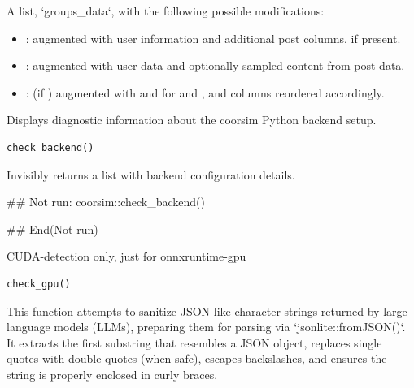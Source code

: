 \documentclass[a4paper]{book}
\begin{document}
%
\begin{Value}
A list, `groups\_data`, with the following possible modifications:
\begin{itemize}

\item{} : augmented with user information and additional post columns, if present.
\item{} : augmented with user data and optionally sampled content from post data.
\item{} : (if ) augmented with  and 
for  and , and columns reordered accordingly.

\end{itemize}

\end{Value}
%
\begin{Description}
Displays diagnostic information about the coorsim Python backend setup.
\end{Description}
%
\begin{Usage}
\begin{verbatim}
check_backend()
\end{verbatim}
\end{Usage}
%
\begin{Value}
Invisibly returns a list with backend configuration details.
\end{Value}
%
\begin{Examples}
\begin{ExampleCode}
## Not run: 
  coorsim::check_backend()

## End(Not run)
\end{ExampleCode}
\end{Examples}
%
\begin{Description}
CUDA-detection only, just for onnxruntime-gpu
\end{Description}
%
\begin{Usage}
\begin{verbatim}
check_gpu()
\end{verbatim}
\end{Usage}
%
\begin{Description}
This function attempts to sanitize JSON-like character strings returned by large language models (LLMs),
preparing them for parsing via `jsonlite::fromJSON()`. It extracts the first substring that resembles
a JSON object, replaces single quotes with double quotes (when safe), escapes backslashes,
and ensures the string is properly enclosed in curly braces.
\end{Description}
\end{document}
